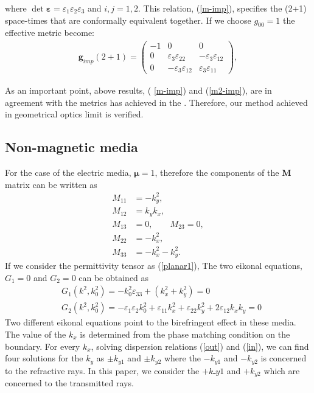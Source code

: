 \documentclass[9pt,twocolumn,twoside]{osajnl}
\begin{document}
where $\det{\boldsymbol{\varepsilon}}=\varepsilon_{1}\varepsilon_{2}\varepsilon_{3}$ and $i,j=1,2$. This relation, (\ref{m-imp}), specifies the (2+1) space-times that are conformally equivalent together. If we choose $g_{00}=1$  the effective metric become:
\begin{align}\label{m2-imp}
\mathbf{g}_{imp}(2+1)=
\begin{pmatrix}
-1&0&0\\
0&\varepsilon_{3}\varepsilon_{22}& -\varepsilon_{3}\varepsilon_{12}\\
0&-\varepsilon_{3}\varepsilon_{12}&\varepsilon_{3}\varepsilon_{11}
\end{pmatrix},
\end{align}

As an important point, above results, ( \ref{m-imp}) and (\ref{m2-imp}), are in agreement with the metrics has achieved in the \cite{leonhardt2012geometry}. Therefore, our method achieved in geometrical optics limit is verified. 

\subsection{Non-magnetic media}

For the case of the electric media, $\boldsymbol{\mu}=1$,  therefore the components of the $\mathbf{M}$ matrix can be written as
\begin{align}\label{m2}
M_{11}&=-k_{y}^{2}, \nonumber\\
M_{12}&=k_{y}k_{x}, \nonumber\\
M_{13}&=0, \qquad M_{23}=0,\nonumber\\
M_{22}&=-k_{x}^{2}, \nonumber\\
M_{33}&=-k_{x}^{2}-k_{y}^{2}.
\end{align}
If we consider the permittivity tensor as (\ref{planar1}), The two eikonal equations, $G_{1}=0$ and $G_{2}=0$ can be obtained as
\begin{eqnarray}
&G_{1}(k^2,k^2_{0})=-k^{2}_{0} \varepsilon_{33}+(k_{x}^{2}+k_{y}^{2})=0 \label{out}\\
&G_{2}(k^2,k^2_{0})=-\varepsilon_{1}\varepsilon_{2} k_{0}^{2}+\varepsilon_{11}k_{x}^{2}+\varepsilon_{22}k_{y}^{2}+2\varepsilon_{12}k_{x}k_{y}=0 \label{in}
\end{eqnarray}
Two different eikonal equations point to the birefringent effect in these media. The value of the $ k_{x}$ is determined from the phase matching condition on the boundary. For every $k_{x}$, solving dispersion relations (\ref{out}) and (\ref{in}), we can find four solutions for the $k_{y}$ as $\pm k_{y1}$ and $\pm k_{y2}$ where the $-k_{y1}$ and $-k_{y2}$ is concerned to the refractive rays. In this paper, we consider the  $+kـ{y1}$ and $+k_{y2}$ which are concerned to the transmitted rays. 
\end{document}
